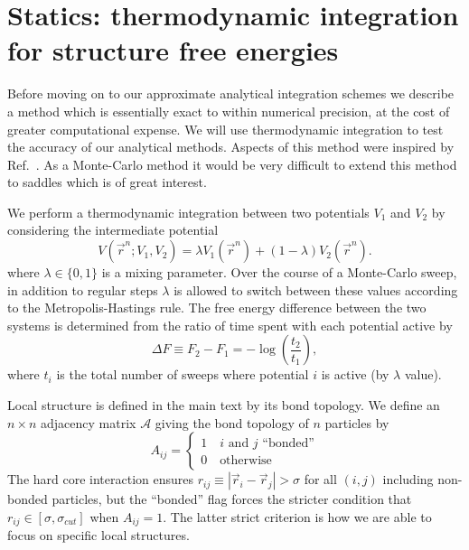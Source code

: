 \documentclass[11pt,twoside]{report}
\begin{document}
\section{Statics: thermodynamic integration for structure free energies}


Before moving on to our approximate analytical integration schemes we describe a method which is essentially exact to within numerical precision, at the cost of greater computational expense.
We will use thermodynamic integration to test the accuracy of our analytical methods.
Aspects of this method were inspired by Ref.\ \cite{SchillingJCP2009}.
As a Monte-Carlo method it would be very difficult to extend this method to saddles which is of great interest.

We perform a thermodynamic integration between two potentials $V_1$ and $V_2$ by considering the intermediate potential
\begin{equation}
  V(\vec{r}^n; V_1, V_2) = \lambda V_1(\vec{r}^n) + (1-\lambda) V_2(\vec{r}^n).
\end{equation}
where $\lambda \in \{0,1\}$ is a mixing parameter.
Over the course of a Monte-Carlo sweep, in addition to regular steps $\lambda$ is allowed to switch between these values according to the Metropolis-Hastings rule.
The free energy difference between the two systems is determined from the ratio of time spent with each potential active by
\begin{equation}
  \Delta F \equiv F_2 - F_1 = -\log{\left( \frac{t_2}{t_1} \right)},
\end{equation}
where $t_i$ is the total number of sweeps where potential $i$ is active (by $\lambda$ value).

Local structure is defined in the main text by its bond topology.
We define an $n \times n$ adjacency matrix $\mathcal{A}$ giving the bond topology of $n$ particles by
\begin{equation}
  A_{ij} =
  \begin{cases}
  1 \quad i \textrm{ and } j \textrm{ ``bonded''} \\
  0 \quad \textrm{otherwise}
  \end{cases}
\end{equation}
The hard core interaction ensures $r_{ij} \equiv |\vec{r}_i - \vec{r}_j| > \sigma$ for all $(i,j)$ including non-bonded particles, but the ``bonded'' flag forces the stricter condition that $r_{ij} \in [\sigma, \sigma_{cut}]$ when $A_{ij} = 1$.
The latter strict criterion is how we are able to focus on specific local structures.
\end{document}
